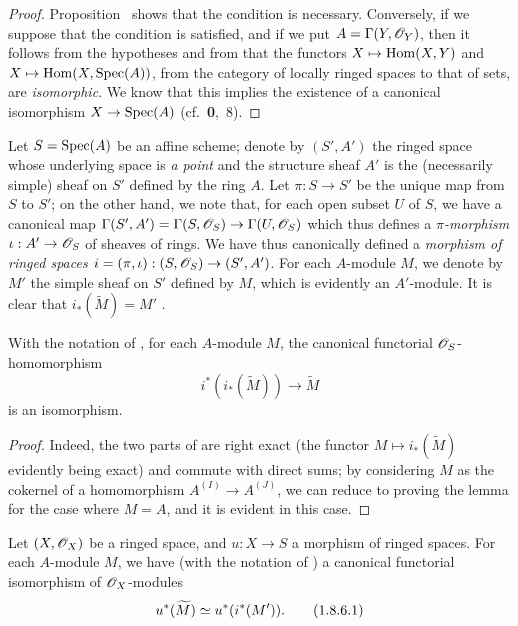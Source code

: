 \begin{proof}
\label{proof-I.1.8.3}
Proposition~ shows that the condition is necessary.
Conversely, if we suppose that the condition is satisfied, and if we put $A=\Gamma(Y,\mathscr{O}_Y)$, then it follows from the hypotheses and from  that the functors $X\mapsto\Hom(X,Y)$ and $X\mapsto\Hom(X,\Spec(A))$, from the category of locally ringed spaces to that of sets, are \emph{isomorphic}.
We know that this implies the existence of a canonical isomorphism $X\to\Spec(A)$ (cf.~\textbf{0},~8).
\end{proof}

\begin{env}[1.8.4]
\label{I.1.8.4}
Let $S=\operatorname{Spec}(A)$ be an affine scheme;
denote by $(S',A')$ the ringed space whose underlying space is \emph{a point} and the structure sheaf $A'$ is the (necessarily simple) sheaf on $S'$ defined by the ring $A$.
Let $\pi:S\to S'$ be the unique map from $S$ to $S'$;
on the other hand, we note that, for each open subset $U$ of $S$, we have a canonical map $\Gamma(S',A')=\Gamma(S,\sh{O}_S)\to\Gamma(U,\sh{O}_S)$ which thus defines a \emph{$\pi$-morphism} $\iota:A'\to\sh{O}_S$ of sheaves of rings.
We have thus canonically defined a \emph{morphism of ringed spaces $i=(\pi,\iota):(S,\sh{O}_S)\to(S',A')$}.
For each $A$-module $M$, we denote by $M'$ the simple sheaf on $S'$ defined by $M$, which is evidently an $A'$-module.
It is clear that $i_*(\widetilde{M})=M'$ .
\end{env}

\begin{lemma}[1.8.5]
\label{I.1.8.5}
With the notation of , for each $A$-module $M$, the canonical functorial $\mathscr{O}_S$-homomorphism 
\[
\label{I.1.8.5.1}
  i^*(i_*(\widetilde{M}))\to\widetilde{M}
  \tag{1.8.5.1}
\]
is an isomorphism.
\end{lemma}

\begin{proof}
\label{proof-I.1.8.5}
Indeed, the two parts of  are right exact (the functor $M\mapsto i_*(\widetilde{M})$ evidently being exact) and commute with direct sums;
by considering $M$ as the cokernel of a homomorphism $A^{(I)}\to A^{(J)}$, we can reduce to proving the lemma for the case where $M=A$, and it is evident in this case.
\end{proof}

\begin{corollary}[1.8.6]
\label{I.1.8.6}
Let $(X,\mathscr{O}_X)$ be a ringed space, and $u:X\to S$ a morphism of ringed spaces.
For each $A$-module $M$, we have (with the notation of ) a canonical functorial isomorphism of $\mathscr{O}_X$-modules
\[
\label{I.1.8.6.1}
  u^*(\widetilde{M})\simeq u^*(i^*(M')).
  \tag{1.8.6.1}
\]
\end{corollary}

